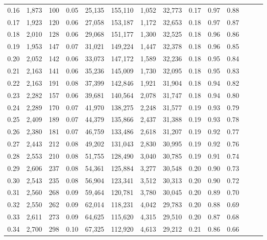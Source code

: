 \begin{tabular}{rrrrrrrrrrrrrr}
0.16 &  1,873 &    100 &  0.05 &   25,135 &  155,110 &   1,052 &  32,773 &  0.17 &  0.97 &      0.88 \\
0.17 &  1,923 &    120 &  0.06 &   27,058 &  153,187 &   1,172 &  32,653 &  0.18 &  0.97 &      0.87 \\
0.18 &  2,010 &    128 &  0.06 &   29,068 &  151,177 &   1,300 &  32,525 &  0.18 &  0.96 &      0.86 \\
0.19 &  1,953 &    147 &  0.07 &   31,021 &  149,224 &   1,447 &  32,378 &  0.18 &  0.96 &      0.85 \\
0.20 &  2,052 &    142 &  0.06 &   33,073 &  147,172 &   1,589 &  32,236 &  0.18 &  0.95 &      0.84 \\
0.21 &  2,163 &    141 &  0.06 &   35,236 &  145,009 &   1,730 &  32,095 &  0.18 &  0.95 &      0.83 \\
0.22 &  2,163 &    191 &  0.08 &   37,399 &  142,846 &   1,921 &  31,904 &  0.18 &  0.94 &      0.82 \\
0.23 &  2,282 &    157 &  0.06 &   39,681 &  140,564 &   2,078 &  31,747 &  0.18 &  0.94 &      0.80 \\
0.24 &  2,289 &    170 &  0.07 &   41,970 &  138,275 &   2,248 &  31,577 &  0.19 &  0.93 &      0.79 \\
0.25 &  2,409 &    189 &  0.07 &   44,379 &  135,866 &   2,437 &  31,388 &  0.19 &  0.93 &      0.78 \\
0.26 &  2,380 &    181 &  0.07 &   46,759 &  133,486 &   2,618 &  31,207 &  0.19 &  0.92 &      0.77 \\
0.27 &  2,443 &    212 &  0.08 &   49,202 &  131,043 &   2,830 &  30,995 &  0.19 &  0.92 &      0.76 \\
0.28 &  2,553 &    210 &  0.08 &   51,755 &  128,490 &   3,040 &  30,785 &  0.19 &  0.91 &      0.74 \\
0.29 &  2,606 &    237 &  0.08 &   54,361 &  125,884 &   3,277 &  30,548 &  0.20 &  0.90 &      0.73 \\
0.30 &  2,543 &    235 &  0.08 &   56,904 &  123,341 &   3,512 &  30,313 &  0.20 &  0.90 &      0.72 \\
0.31 &  2,560 &    268 &  0.09 &   59,464 &  120,781 &   3,780 &  30,045 &  0.20 &  0.89 &      0.70 \\
0.32 &  2,550 &    262 &  0.09 &   62,014 &  118,231 &   4,042 &  29,783 &  0.20 &  0.88 &      0.69 \\
0.33 &  2,611 &    273 &  0.09 &   64,625 &  115,620 &   4,315 &  29,510 &  0.20 &  0.87 &      0.68 \\
0.34 &  2,700 &    298 &  0.10 &   67,325 &  112,920 &   4,613 &  29,212 &  0.21 &  0.86 &      0.66 \\

\end{tabular}
